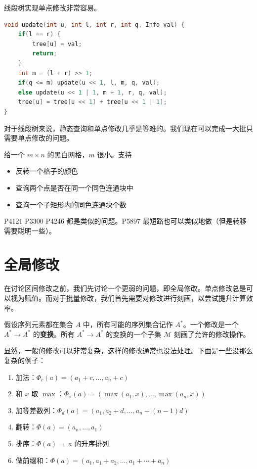 线段树实现单点修改非常容易。

\begin{lstlisting}[language=C++, caption={线段树单点修改}]
void update(int u, int l, int r, int q, Info val) {
    if(l == r) {
        tree[u] = val;
        return;
    }
    int m = (l + r) >> 1;
    if(q <= m) update(u << 1, l, m, q, val);
    else update(u << 1 | 1, m + 1, r, q, val);
    tree[u] = tree[u << 1] + tree[u << 1 | 1];
}
\end{lstlisting}

对于线段树来说，静态查询和单点修改几乎是等难的。我们现在可以完成一大批只需要单点修改的问题。

\begin{exercise}[网格图连通性]
    给一个 $m\times n$ 的黑白网格，$m$ 很小。支持
    \begin{itemize}
        \item 反转一个格子的颜色
        \item 查询两个点是否在同一个同色连通块中
        \item 查询一个子矩形内的同色连通块个数
    \end{itemize}
    P4121 P3300 P4246 都是类似的问题。P5897 最短路也可以类似地做（但是转移需要聪明一些）。
\end{exercise}


\section{全局修改}

在讨论区间修改之前，我们先讨论一个更弱的问题，即全局修改。单点修改总是可以视为赋值。而对于批量修改，我们首先需要对修改进行刻画，以尝试提升计算效率。

\begin{definition}[修改]
    假设序列元素都在集合 $A$ 中，所有可能的序列集合记作 $A^*$。一个修改是一个 $A^*\to A^*$ 的\textbf{变换}。所有 $A^*\to A^*$ 的变换的一个子集 $\mathcal M$ 刻画了允许的修改操作。
\end{definition}

显然，一般的修改可以非常复杂，这样的修改通常也没法处理。下面是一些没那么复杂的例子：

\begin{example}
    \begin{enumerate}
        \item 加法：$\Phi_c(a)=(a_1+c,\ldots,a_n+c)$
        \item 和 $x$ 取 $\max$：$\Phi_x(a)=(\max(a_1,x),\ldots,\max(a_n,x))$
        \item 加等差数列：$\Phi_{d}(a)=(a_1,a_2+d,\ldots,a_n+(n-1)d)$
        \item 翻转：$\Phi(a)=(a_n,\ldots,a_1)$
        \item 排序：$\Phi(a)=$ $a$ 的升序排列
        \item 做前缀和：$\Phi(a)=(a_1,a_1+a_2,\ldots,a_1+\cdots+a_n)$
    \end{enumerate}
\end{example}


